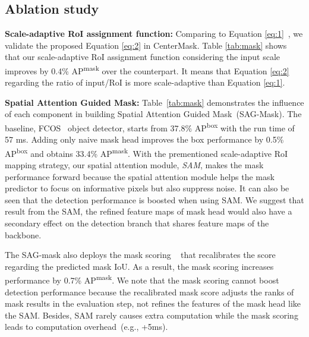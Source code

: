 \documentclass[10pt,twocolumn,letterpaper]{article}
\begin{document}
\subsection{Ablation study}
\noindent
\textbf{Scale-adaptive RoI assignment function:}
Comparing to Equation \ref{eq:1}~\cite{lin2017feature}, we validate the proposed Equation \ref{eq:2} in CenterMask.
Table \ref{tab:mask} shows that our scale-adaptive RoI assignment function considering the input scale improves by 0.4\% AP\textsuperscript{mask} over the counterpart.
It means that Equation \ref{eq:2} regarding the ratio of input/RoI is more scale-adaptive than Equation \ref{eq:1}.



\noindent
\textbf{Spatial Attention Guided Mask:}
Table~\ref{tab:mask} demonstrates the influence of each component in building Spatial Attention Guided Mask~(SAG-Mask).
The baseline, FCOS~\cite{Tian_2019_ICCV} object detector, starts from 37.8\% AP\textsuperscript{box} with the run time of 57 ms.
Adding only naive mask head improves the box performance by 0.5\% AP\textsuperscript{box} and obtains 33.4\% AP\textsuperscript{mask}.
With the prementioned scale-adaptive RoI mapping strategy, our spatial attention module, \textit{SAM}, makes the mask performance forward because the spatial attention module helps the mask predictor to focus on informative pixels but also suppress noise.
It can also be seen that the detection performance is boosted when using SAM.
We suggest that result from the SAM, the refined feature maps of mask head would also have a secondary effect on the detection branch that shares feature maps of the backbone.

The SAG-mask also deploys the mask scoring ~\cite{huang2019mask} that recalibrates the score regarding the predicted mask IoU.
As a result, the mask scoring increases performance by 0.7\% AP\textsuperscript{mask}.
We note that the mask scoring cannot boost detection performance because the recalibrated mask score adjusts the ranks of mask results in the evaluation step, not refines the features of the mask head like the SAM.
Besides, SAM rarely causes extra computation while the mask scoring leads to computation overhead~(e.g., +5ms).
\\
\end{document}
